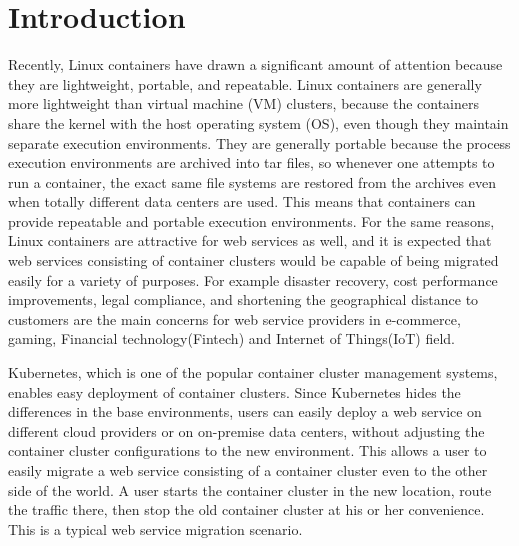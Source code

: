 \section{Introduction}

Recently, Linux containers have drawn a significant amount of attention because they are lightweight, portable, and repeatable.
Linux containers are generally more lightweight than virtual machine (VM) clusters, because the containers share the kernel with the host operating system (OS), even though they maintain separate execution environments.
They are generally portable because the process execution environments are archived into tar files,
so whenever one attempts to run a container, the exact same file systems are restored from the archives
even when totally different data centers are used.
This means that containers can provide repeatable and portable execution environments.
%
For the same reasons, Linux containers are attractive for web services as well,
and it is expected that web services consisting of container clusters would be
capable of being migrated easily for a variety of purposes. For example disaster recovery,
cost performance improvements, legal compliance, and shortening the geographical distance to customers
are the main concerns for web service providers in e-commerce, gaming, Financial technology(Fintech) and Internet of Things(IoT) field.
%

Kubernetes\cite{K8s2017}, which is one of the popular container cluster management systems, 
enables easy deployment of container clusters.
Since Kubernetes hides the differences in the base environments, users can easily deploy a web service on different 
cloud providers or on on-premise data centers, without adjusting the container cluster configurations to the new environment. 
This allows a user to easily migrate a web service consisting of a container cluster even to the other side of the world. 
A user starts the container cluster in the new location, route the traffic there, 
then stop the old container cluster at his or her convenience.
This is a typical web service migration scenario.

